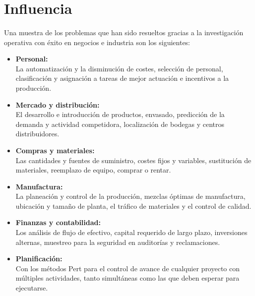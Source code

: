 \documentclass[12pt, a4paper,spanish]{article}
\begin{document}
	\section{Influencia}
		\paragraph{}
		Una muestra de los problemas que  han sido resueltos gracias a la investigación operativa con éxito en negocios e industria son los siguientes:

		\begin{itemize}

			\item \textbf{Personal:} \\
			La automatización y la disminución de costes, selección de personal, clasificación y asignación a tareas de mejor actuación e incentivos a la producción. \cite{wikipedia_IO}

			\item \textbf{Mercado y distribución:} \\
			El desarrollo e introducción de productos, envasado, predicción de la demanda y actividad competidora, localización de bodegas y centros distribuidores. \cite{wikipedia_IO}

			\item \textbf{Compras y materiales:} \\
			Las cantidades y fuentes de suministro, costes fijos y variables, sustitución de materiales, reemplazo de equipo, comprar o rentar. \cite{wikipedia_IO}

			\item \textbf{Manufactura:} \\
			La planeación y control de la producción, mezclas óptimas de manufactura, ubicación y tamaño de planta, el tráfico de materiales y el control de calidad. \cite{wikipedia_IO}

			\item \textbf{Finanzas y contabilidad:} \\
			Los análisis de flujo de efectivo, capital requerido de largo plazo, inversiones alternas, muestreo para la seguridad en auditorías y reclamaciones. \cite{wikipedia_IO}

			\item \textbf{Planificación:} \\
			Con los métodos Pert para el control de avance de cualquier proyecto con múltiples actividades, tanto simultáneas como las que deben esperar para ejecutarse. \cite{wikipedia_IO}

		\end{itemize}
\end{document}
